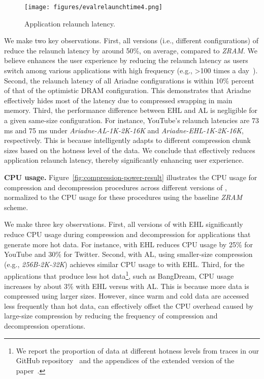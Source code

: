 \begin{figure}[!h]
\vspace{0.3em}
\centering
\texttt{[image: figures/evalrelaunchtime4.png]}
\caption{Application relaunch latency.}
\label{fig:hot-launch-latency}
\end{figure}

We make two key observations. First, all versions (i.e., different configurations) of \proposal reduce the relaunch latency by around 50\%, on average, compared to \emph{ZRAM}. We believe \proposal enhances the user experience by reducing the relaunch latency as users switch among various applications with high frequency (e.g., >100 times a day~\cite{deng2019measuring}).
 Second, the relaunch latency of all Ariadne configurations is within 10\% percent of that of the optimistic DRAM configuration. This demonstrates that Ariadne effectively hides most of the latency due to compressed swapping in main memory.
Third, the performance difference between EHL and AL is negligible for a given same-size configuration. For instance, YouTube's relaunch latencies are 73 ms and 75 ms under \emph{Ariadne-AL-1K-2K-16K} and \emph{Ariadne-EHL-1K-2K-16K}, respectively. This is because \proposal intelligently adapts to different compression chunk sizes based on the hotness level of the data.
We conclude that \proposal effectively reduces application relaunch latency, thereby significantly enhancing user experience.

\noindent\textbf{CPU usage.}
Figure~\ref{fig:compression-power-result} illustrates the CPU usage for compression and decompression procedures across different versions of \proposal, normalized to the CPU usage for these procedures using the baseline \emph{ZRAM} scheme. 


We make three key observations. First, all versions of \proposal with EHL significantly reduce CPU usage during compression and decompression for applications that generate more hot data. For instance, \proposal with EHL reduces CPU usage by 25\% for YouTube and 30\% for Twitter. 
Second, \proposal with AL, using smaller-size compression (e.g., \emph{256B-2K-32K}) achieves similar CPU usage to \proposal with EHL. Third, for the applications that produce less hot data\footnote{ We report the proportion of data at different hotness levels from traces in our GitHub repository~\cite{github} and the appendices of the extended version of the paper~\cite{LiangAxiv}.}, such as BangDream, CPU usage increases by about 3\% with EHL versus with AL. This is because more data is compressed using larger sizes.
However, since warm and cold data are accessed less frequently than hot data, \proposal can effectively offset the CPU overhead caused by large-size compression by reducing the frequency of compression and decompression operations.

